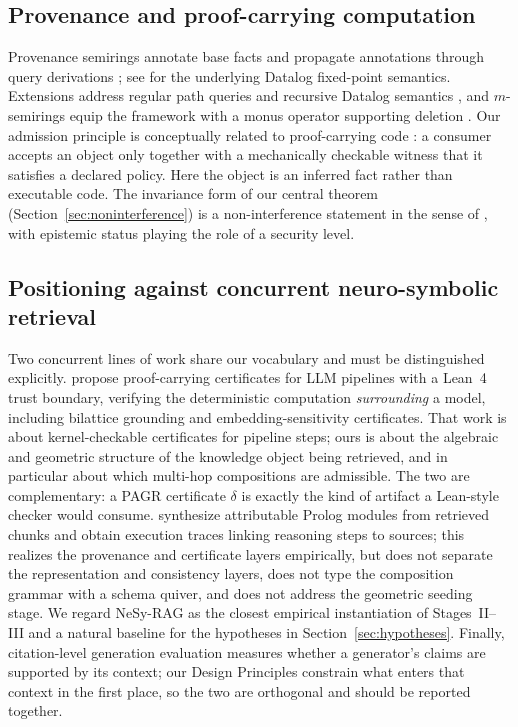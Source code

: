 \documentclass[11pt]{article}
\begin{document}
\subsection{Provenance and proof-carrying computation}
Provenance semirings annotate base facts and propagate annotations through query derivations \citep{green2007}; see \citet{abiteboul1995} for the underlying Datalog fixed-point semantics. Extensions address regular path queries and recursive Datalog semantics \citep{grahne2020,bourgeois2022,khamis2021}, and $m$-semirings equip the framework with a monus operator supporting deletion \citep{geerts2010}. Our admission principle is conceptually related to proof-carrying code \citep{necula1997}: a consumer accepts an object only together with a mechanically checkable witness that it satisfies a declared policy. Here the object is an inferred fact rather than executable code. The invariance form of our central theorem (Section~\ref{sec:noninterference}) is a non-interference statement in the sense of \citet{goguen1982}, with epistemic status playing the role of a security level.

\subsection{Positioning against concurrent neuro-symbolic retrieval}
\label{sec:concurrent}
Two concurrent lines of work share our vocabulary and must be distinguished explicitly. \citet{koomullil2026} propose proof-carrying certificates for LLM pipelines with a Lean~4 trust boundary, verifying the deterministic computation \emph{surrounding} a model, including bilattice grounding and embedding-sensitivity certificates. That work is about kernel-checkable certificates for pipeline steps; ours is about the algebraic and geometric structure of the knowledge object being retrieved, and in particular about which multi-hop compositions are admissible. The two are complementary: a PAGR certificate $\delta$ is exactly the kind of artifact a Lean-style checker would consume. \citet{gann2026} synthesize attributable Prolog modules from retrieved chunks and obtain execution traces linking reasoning steps to sources; this realizes the provenance and certificate layers empirically, but does not separate the representation and consistency layers, does not type the composition grammar with a schema quiver, and does not address the geometric seeding stage. We regard NeSy-RAG as the closest empirical instantiation of Stages~II--III and a natural baseline for the hypotheses in Section~\ref{sec:hypotheses}. Finally, citation-level generation evaluation \citep{gao2023} measures whether a generator's claims are supported by its context; our Design Principles constrain what enters that context in the first place, so the two are orthogonal and should be reported together.
\end{document}
